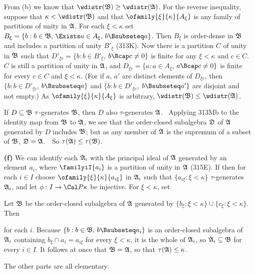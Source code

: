{ From (b) we know that
$\wdistr(\frak B)\ge\wdistr(\frak A)$.   For the reverse inequality,
suppose that $\kappa<\wdistr(\frak B)$ and that
$\ofamily{\xi}{\kappa}{A_{\xi}}$ is any family of partitions of unity in
$\frak A$.    For each $\xi<\kappa$ set
$B_{\xi}=\{b:b\in\frak B,\,\Exists a\in A_{\xi},\,b\Bsubseteq a\}$.
Then $B_{\xi}$ is order-dense in $\frak B$ and includes a partition of
unity $B'_{\xi}$ (313K).
Now there is a partition $C$ of unity in $\frak B$
such that $D'_{\xi c}=\{b:b\in B'_{\xi}$, $b\Bcap c\ne 0\}$ is finite
for any $\xi<\kappa$ and $c\in C$.   $C$ is still a partition of unity
in $\frak A$, and $D_{\xi c}=\{a:a\in A_{\xi}$, $a\Bcap c\ne 0\}$ is
finite for every $c\in C$ and $\xi<\kappa$.   (For if $a$, $a'$ are
distinct elements of $D_{\xi c}$, then $\{b:b\in D'_{\xi c}$,
$b\Bsubseteq a\}$ and $\{b:b\in D'_{\xi c}$, $b\Bsubseteq a'\}$ are
disjoint and not empty.)   As
$\ofamily{\xi}{\kappa}{A_{\xi}}$ is arbitrary,
$\wdistr(\frak B)\le\wdistr(\frak A)$.

\medskip

 If $D\subseteq\frak B\,\,\tau$-generates $\frak B$,
then $D$ also $\tau$-generates $\frak A$.   \Prf\ Applying 313Mb to the
identity map from $\frak B$ to $\frak A$, we see that the
order-closed subalgebra $\frak D$ of $\frak A$ generated by $D$ includes
$\frak B$;  but as any member of $\frak A$ is the supremum of a subset
of $\frak B$, $\frak D=\frak A$.\ \QeD\   So
$\tau(\frak A)\le\tau(\frak B)$.

\medskip

{\bf (f)} We can identify each $\frak A_i$ with the principal ideal of
$\frak A$ generated by an element $a_i$, where $\familyiI{a_i}$ is a
partition of unity in $\frak A$ (315E).   If
then for each $i\in I$
choose $\ofamily{\xi}{\kappa}{a_{i\xi}}$ in $\frak A_i$ such that
$\{a_{i\xi}:\xi<\kappa\}\,\,\tau$-generates $\frak A_i$, and let
$\phi:I\to\Cal P\kappa$ be injective.   For $\xi<\kappa$, set


\noindent Let $\frak B$ be the order-closed subalgebra of $\frak A$
generated by $\{b_{\xi}:\xi<\kappa\}\cup\{c_{\xi}:\xi<\kappa\}$.
Then


\noindent for each $i$.   Because $\{b:b\in\frak B,\,b\Bsubseteq a_i\}$
is an order-closed subalgebra of $\frak A_i$ containing
$b_{\xi}\cap a_i=a_{i\xi}$ for every $\xi<\kappa$, it is the whole of
$\frak A_i$, so $\frak A_i\subseteq\frak B$ for every $i\in I$.   It
follows at once that $\frak B=\frak A$, so that
$\tau(\frak A)\le\kappa$.

The other parts are all elementary.
}%

